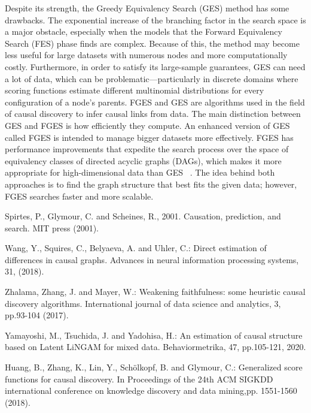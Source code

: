 \documentclass[runningheads]{llncs}
\begin{document}
Despite its strength, the Greedy Equivalency Search (GES) method has some drawbacks. The exponential increase of the branching factor in the search space is a major obstacle, especially when the models that the Forward Equivalency Search (FES) phase finds are complex. Because of this, the method may become less useful for large datasets with numerous nodes and more computationally costly. Furthermore, in order to satisfy its large-sample guarantees, GES can need a lot of data, which can be problematic—particularly in discrete domains where scoring functions estimate different multinomial distributions for every configuration of a node's parents. 
FGES and GES are algorithms used in the field of causal discovery to infer causal links from data. The main distinction between GES and FGES is how efficiently they compute. An enhanced version of GES called FGES is intended to manage bigger datasets more effectively. FGES has performance improvements that expedite the search process over the space of equivalency classes of directed acyclic graphs (DAGs), which makes it more appropriate for high-dimensional data than GES ~\cite{huang2018generalized}. The idea behind both approaches is to find the graph structure that best fits the given data; however, FGES searches faster and more scalable.

\begin{thebibliography}{5}
Spirtes, P., Glymour, C. and Scheines, R., 2001. Causation, prediction, and search. MIT press (2001).

Wang, Y., Squires, C., Belyaeva, A. and Uhler, C.: Direct estimation of differences in causal graphs. Advances in neural information processing systems, 31, (2018).

Zhalama, Zhang, J. and Mayer, W.: Weakening faithfulness: some heuristic causal discovery algorithms. International journal of data science and analytics, 3, pp.93-104 (2017).

Yamayoshi, M., Tsuchida, J. and Yadohisa, H.: An estimation of causal structure based on Latent LiNGAM for mixed data. Behaviormetrika, 47, pp.105-121, 2020.

Huang, B., Zhang, K., Lin, Y., Schölkopf, B. and Glymour, C.: Generalized score functions for causal discovery. In Proceedings of the 24th ACM SIGKDD international conference on knowledge discovery and data mining,pp. 1551-1560 (2018).
\end{thebibliography}
\end{document}
